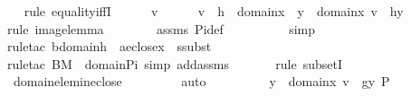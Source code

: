 \begin{isabellebody}
\ \ \isamarkupfalse%
{\isacharparenleft}{\kern0pt}rule\ equality{\isacharunderscore}{\kern0pt}iffI{\isacharparenright}{\kern0pt}\isanewline
\ \ \ \ \isamarkupfalse%
\ v\isanewline
\ \ \ \ \isamarkupfalse%
\ {\isachardoublequoteopen}v\ {\isasymin}\ h\ {\isacharbackquote}{\kern0pt}{\isacharbackquote}{\kern0pt}\ domain{\isacharparenleft}{\kern0pt}x{\isacharparenright}{\kern0pt}\ {\isasymlongleftrightarrow}\ {\isacharparenleft}{\kern0pt}{\isasymexists}y\ {\isasymin}\ domain{\isacharparenleft}{\kern0pt}x{\isacharparenright}{\kern0pt}{\isachardot}{\kern0pt}\ v\ {\isacharequal}{\kern0pt}\ h{\isacharbackquote}{\kern0pt}y{\isacharparenright}{\kern0pt}{\isachardoublequoteclose}\isanewline
\ \ \ \ \ \ \isamarkupfalse%
{\isacharparenleft}{\kern0pt}rule\ image{\isacharunderscore}{\kern0pt}lemma{\isacharparenright}{\kern0pt}\isanewline
\ \ \ \ \ \ \isamarkupfalse%
\ assms\ Pi{\isacharunderscore}{\kern0pt}def\ \isanewline
\ \ \ \ \ \ \ \isamarkupfalse%
\ simp\isanewline
\ \ \ \ \ \ \isamarkupfalse%
{\isacharparenleft}{\kern0pt}rule{\isacharunderscore}{\kern0pt}tac\ b{\isacharequal}{\kern0pt}{\isachardoublequoteopen}domain{\isacharparenleft}{\kern0pt}h{\isacharparenright}{\kern0pt}{\isachardoublequoteclose}\ \ a{\isacharequal}{\kern0pt}{\isachardoublequoteopen}eclose{\isacharparenleft}{\kern0pt}x{\isacharparenright}{\kern0pt}{\isachardoublequoteclose}\ \ ssubst{\isacharparenright}{\kern0pt}\ \isanewline
\ \ \ \ \ \ \ \isamarkupfalse%
{\isacharparenleft}{\kern0pt}rule{\isacharunderscore}{\kern0pt}tac\ B{\isacharequal}{\kern0pt}M\ \ domain{\isacharunderscore}{\kern0pt}Pi{\isacharcomma}{\kern0pt}\ simp\ add{\isacharcolon}{\kern0pt}assms{\isacharparenright}{\kern0pt}\isanewline
\ \ \ \ \ \ \isamarkupfalse%
{\isacharparenleft}{\kern0pt}rule\ subsetI{\isacharparenright}{\kern0pt}\isanewline
\ \ \ \ \ \ \isamarkupfalse%
\ domain{\isacharunderscore}{\kern0pt}elem{\isacharunderscore}{\kern0pt}in{\isacharunderscore}{\kern0pt}eclose\ \isanewline
\ \ \ \ \ \ \isamarkupfalse%
\ auto\isanewline
\ \ \ \ \isamarkupfalse%
\ \isamarkupfalse%
\ {\isachardoublequoteopen}{\isachardot}{\kern0pt}{\isachardot}{\kern0pt}{\isachardot}{\kern0pt}\ {\isasymlongleftrightarrow}\ {\isacharparenleft}{\kern0pt}{\isasymexists}y\ {\isasymin}\ domain{\isacharparenleft}{\kern0pt}x{\isacharparenright}{\kern0pt}{\isachardot}{\kern0pt}\ v\ {\isacharequal}{\kern0pt}\ g{\isacharbackquote}{\kern0pt}{\isacharless}{\kern0pt}y{\isacharcomma}{\kern0pt}\ P{\isachargreater}{\kern0pt}{\isacharparenright}{\kern0pt}{\isachardoublequoteclose}\ \isanewline

\end{isabellebody}
